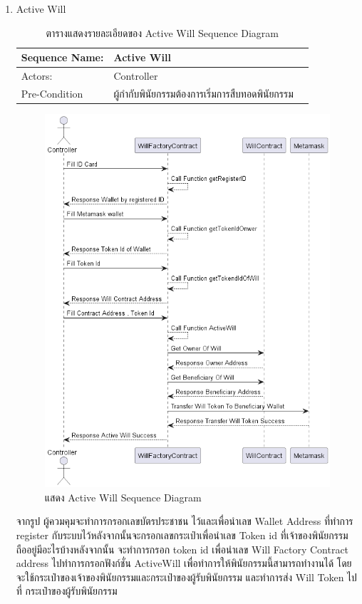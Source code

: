 \documentclass[12pt,oneside,openright,a4paper]{cpe-thai-project}
\begin{document}
\begin{enumerate}[label=\thesubsection.\arabic*,leftmargin=0pt,itemindent=1.25cm]
\clearpage
\item Active Will
	\begin{table}[h]
\centering
\caption{ตารางแสดงรายละเอียดของ Active Will Sequence Diagram}
\begin{tabularx}{\textwidth}{|l|X|X|} 
\hline
Sequence Name: & Active Will                                          \\ 
\hline
Actors:        & Controller                                           \\ 
\hline
Pre-Condition  & ผู้กำกับพินัยกรรมต้องการเริ่มการสืบทอดพินัยกรรม  \\
\hline
\end{tabularx}
\end{table}
		\begin{figure}[!thb]
			\centering
			\includegraphics[scale=0.45]{activeWillseq}
			\caption{แสดง Active Will Sequence Diagram}
		\end{figure}
		\FloatBarrier
	\tab จากรูป ผู้ควมคุมจะทำการกรอกเลขบัตรประชาชน ไว้และเพื่อนำเลข Wallet Address ที่ทำการ register กับระบบไว้หลังจากนั้นจะกรอกเลขกระเป๋าเพื่อนำเลข Token id ที่เจ้าของพินัยกรรมถืออยู่มีอะไรบ้างหลังจากนั้น จะทำการกรอก token id เพื่อนำเลข Will Factory Contract address ไปทำการกรอกฟังก์ชั่น ActiveWill เพื่อทำการให้พินัยกรรมนี้สามารถทำงานได้ โดยจะใช้กระเป๋าของเจ้าของพินัยกรรมและกระเป๋าของผู้รับพินัยกรรม และทำการส่ง Will Token ไปที่ กระเป๋าของผู้รับพินัยกรรม
	

\end{enumerate}
\end{document}
